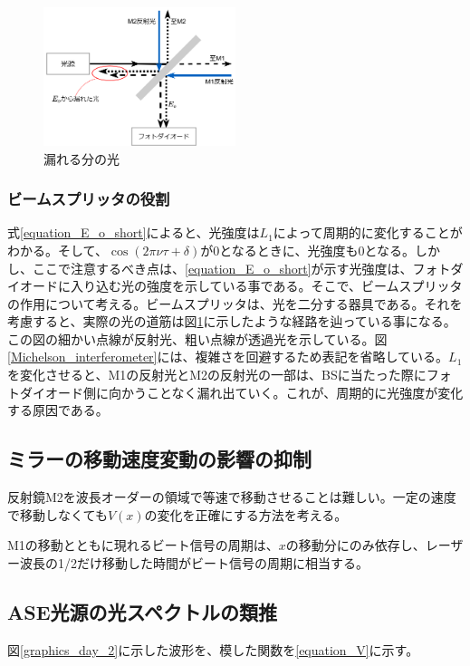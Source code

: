 \documentclass[uplatex, titlepage, fontsize=10pt, paper=a4paper]{jsarticle}
\numberwithin{equation}{section}
\begin{document}
\begin{figure}
    \centering
    \includegraphics[width = 0.5\textwidth]{画像フォルダ/interference_detail.png}
    \caption{漏れる分の光}
    \label{interferometer_detail}
\end{figure}

\subsubsection{ビームスプリッタの役割}
式\ref{equation_E_o_short}によると、光強度は$L_{1}$によって周期的に変化することがわかる。そして、$\cos(2\pi\nu\tau+\delta)$が0となるときに、光強度も0となる。しかし、ここで注意するべき点は、\ref{equation_E_o_short}が示す光強度は、フォトダイオードに入り込む光の強度を示している事である。そこで、ビームスプリッタの作用について考える。ビームスプリッタは、光を二分する器具である。それを考慮すると、実際の光の道筋は図\ref{interferometer_detail}に示したような経路を辿っている事になる。この図の細かい点線が反射光、粗い点線が透過光を示している。図\ref{Michelson_interferometer}には、複雑さを回避するため表記を省略している。$L_{1}$を変化させると、M1の反射光とM2の反射光の一部は、BSに当たった際にフォトダイオード側に向かうことなく漏れ出ていく。これが、周期的に光強度が変化する原因である。\cite{wave_and_energy_conservation_law}

\subsection{ミラーの移動速度変動の影響の抑制}
反射鏡M2を波長オーダーの領域で等速で移動させることは難しい。一定の速度で移動しなくても$V(x)$の変化を正確にする方法を考える。

M1の移動とともに現れるビート信号の周期は、$x$の移動分にのみ依存し、レーザー波長の1/2だけ移動した時間がビート信号の周期に相当する。

\subsection{ASE光源の光スペクトルの類推}
図\ref{graphics_day_2}に示した波形を、模した関数を\eqref{equation_V}に示す。
\end{document}
